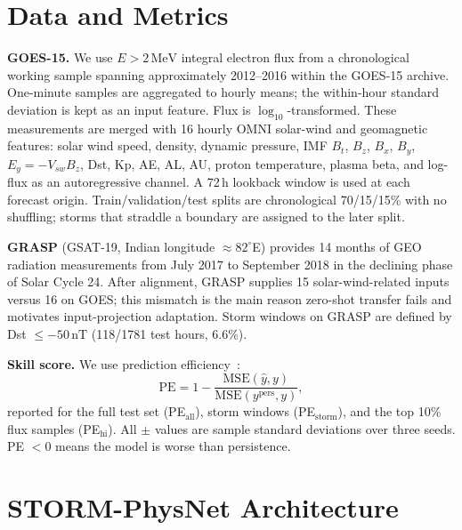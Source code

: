 \documentclass[conference]{IEEEtran}
\begin{document}
\section{Data and Metrics}
\textbf{GOES-15.} We use \(E>2\,\mathrm{MeV}\) integral electron flux from a
chronological working sample spanning approximately 2012--2016 within the
GOES-15 archive. One-minute samples are aggregated to hourly means; the
within-hour standard deviation is kept as an input feature. Flux is
\(\log_{10}\)-transformed. These measurements are merged with 16 hourly OMNI
solar-wind and geomagnetic features: solar wind speed, density, dynamic
pressure, IMF \(B_t\), \(B_z\), \(B_x\), \(B_y\), \(E_y=-V_{sw}B_z\), Dst,
Kp, AE, AL, AU, proton temperature, plasma beta, and log-flux as an
autoregressive channel. A 72\,h lookback window is used at each forecast
origin. Train/validation/test splits are chronological 70/15/15\% with no
shuffling; storms that straddle a boundary are assigned to the later split.

\textbf{GRASP} (GSAT-19, Indian longitude \(\approx82^\circ\)E) provides
14 months of GEO radiation measurements from July 2017 to September 2018 in
the declining phase of Solar Cycle 24. After alignment, GRASP supplies 15
solar-wind-related inputs versus 16 on GOES; this mismatch is the main reason
zero-shot transfer fails and motivates input-projection adaptation. Storm
windows on GRASP are defined by Dst \(\le -50\,\mathrm{nT}\) (118/1781 test
hours, 6.6\%).

\textbf{Skill score.} We use prediction efficiency~\cite{morley2018}:
\begin{equation}
\mathrm{PE}=1-\frac{\mathrm{MSE}(\hat{y},y)}{\mathrm{MSE}(y^{\mathrm{pers}},y)},
\end{equation}
reported for the full test set (PE\(_\mathrm{all}\)), storm windows
(PE\(_\mathrm{storm}\)), and the top 10\% flux samples (PE\(_\mathrm{hi}\)).
All \(\pm\) values are sample standard deviations over three seeds.
PE \(< 0\) means the model is worse than persistence.

\section{STORM-PhysNet Architecture}
\end{document}
